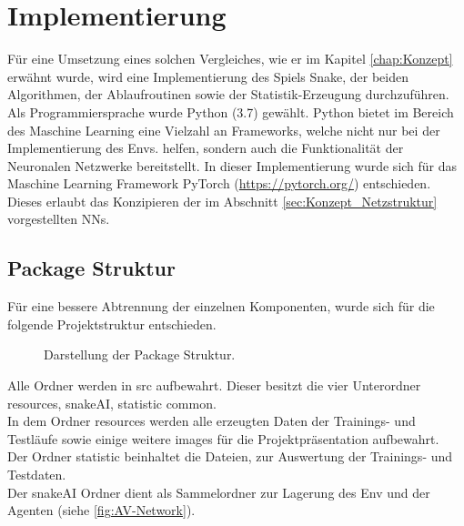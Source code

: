\chapter{Implementierung} \label{chap:Implementierung}
\graphicspath{{Abbildungen/Implementierung/}}
Für eine Umsetzung eines solchen Vergleiches, wie er im Kapitel \ref{chap:Konzept} erwähnt wurde, wird eine Implementierung des Spiels Snake, der beiden Algorithmen, der Ablaufroutinen sowie der Statistik-Erzeugung durchzuführen. Als Programmiersprache wurde Python (3.7) gewählt.
Python bietet im Bereich des Maschine Learning eine Vielzahl an Frameworks, welche nicht nur bei der Implementierung des Envs. helfen, sondern auch die Funktionalität der Neuronalen Netzwerke bereitstellt.
In dieser Implementierung wurde sich für das Maschine Learning Framework PyTorch (\url{https://pytorch.org/}) entschieden. Dieses erlaubt das Konzipieren der im Abschnitt \ref{sec:Konzept_Netzstruktur} vorgestellten NNs.

\section{Package Struktur}
Für eine bessere Abtrennung der einzelnen Komponenten, wurde sich für die folgende Projektstruktur entschieden.
\begin{figure}[H]
	\centering
	\def\svgscale{0.095}
	
	\caption[Package Struktur]{Darstellung der Package Struktur.}
	\label{fig:Package_Struktur}
\end{figure}
Alle Ordner werden in src aufbewahrt. Dieser besitzt die vier Unterordner resources, snakeAI, statistic common.\\
In dem Ordner resources werden alle erzeugten Daten der Trainings- und Testläufe sowie einige weitere images für die Projektpräsentation aufbewahrt.\\
Der Ordner statistic beinhaltet die Dateien, zur Auswertung der Trainings- und Testdaten.\\
Der snakeAI Ordner dient als Sammelordner zur Lagerung des Env und der Agenten (siehe \ref{fig:AV-Network}).

